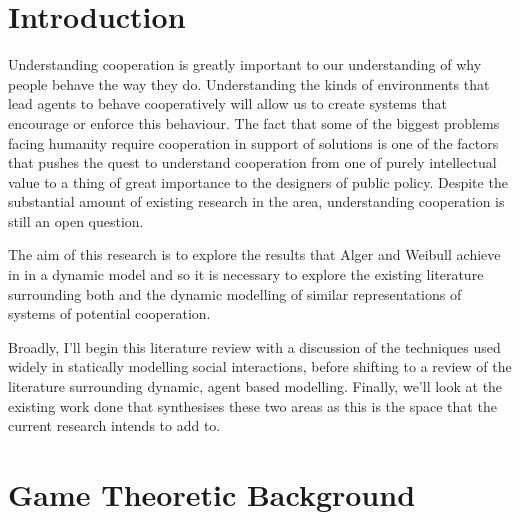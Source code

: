 \documentclass[11pt]{article}
\newcommand*{\np}{\par\noindent\newline}
\begin{document}
\newpage
\tableofcontents
\newpage
\section{Introduction}\label{intro}
Understanding cooperation is greatly important to our understanding of why people behave the way they do.
Understanding the kinds of environments that lead agents to behave cooperatively will allow us to create systems that
encourage or enforce this behaviour. The fact that some of the biggest problems facing humanity require cooperation in
support of solutions is one of the factors that pushes the quest to understand cooperation from one of purely
intellectual value to a thing of great importance to the designers of public policy. Despite the substantial amount of
existing research in the area, understanding cooperation is still an open question.
\np The aim of this research is to explore the results that Alger and Weibull achieve in \cite{alger_homo_2013} in a
dynamic model and so it is necessary to explore the existing literature surrounding both \cite{alger_homo_2013} and the
dynamic modelling of similar representations of systems of potential cooperation.

\np Broadly, I'll begin this literature review with a discussion of the techniques used widely in statically
modelling social interactions, before shifting to a review of the literature surrounding dynamic, agent based modelling.
Finally, we'll look at the existing work done that synthesises these two areas as this is the space that the current
research intends to add to.
\section{Game Theoretic Background}\label{social}
\end{document}
